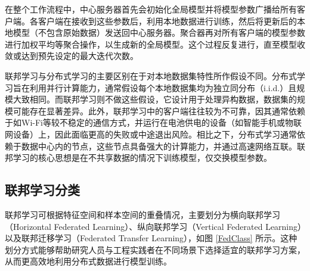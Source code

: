 在整个工作流程中，中心服务器首先会初始化全局模型并将模型参数广播给所有客户端。各客户端在接收到这些参数后，利用本地数据进行训练，然后将更新后的本地模型（不包含原始数据）发送回中心服务器。聚合器再对所有客户端的模型参数进行加权平均等聚合操作，以生成新的全局模型。这个过程反复进行，直至模型收敛或达到预先设定的最大迭代次数。

联邦学习与分布式学习的主要区别在于对本地数据集特性所作假设不同\citep{konevcny2015federated}。分布式学习旨在利用并行计算能力，通常假设每个本地数据集均为独立同分布（i.i.d.）且规模大致相同。而联邦学习则不做这些假设，它设计用于处理异构数据，数据集的规模可能存在显著差异。此外，联邦学习中的客户端往往较为不可靠，因其通常依赖于如Wi-Fi等较不稳定的通信方式，并运行在电池供电的设备（如智能手机或物联网设备）上，因此面临更高的失败或中途退出风险。相比之下，分布式学习通常依赖于数据中心内的节点，这些节点具备强大的计算能力，并通过高速网络互联\citep{kairouz2021advances}。联邦学习的核心思想是在不共享数据的情况下训练模型，仅交换模型参数。

\subsection{联邦学习分类}
联邦学习可根据特征空间和样本空间的重叠情况，主要划分为横向联邦学习（Horizontal Federated Learning）、纵向联邦学习（Vertical Federated Learning）以及联邦迁移学习（Federated Transfer Learning）\citep{yang2019federated,li2020federated}，如图 \ref{FedClass} 所示。这种划分方式能够帮助研究人员与工程实践者在不同场景下选择适宜的联邦学习方案，从而更高效地利用分布式数据进行模型训练。

